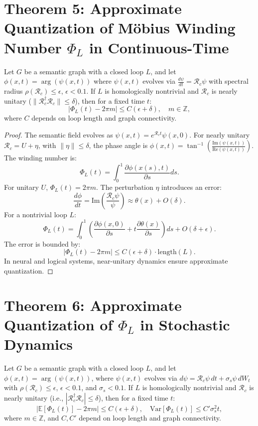 \documentclass[12pt]{article}
\begin{document}
\section*{Theorem 5: Approximate Quantization of Möbius Winding Number \(\Phi_L\) in Continuous-Time}
\begin{theorem}
Let \(G\) be a semantic graph with a closed loop \(L\), and let \(\phi(x,t) = \arg(\psi(x,t))\) where \(\psi(x,t)\) evolves via \(\frac{d\psi}{dt} = \mathcal{R}_c \psi\) with spectral radius \(\rho(\mathcal{R}_c) \leq \epsilon\), \(\epsilon < 0.1\). If \(L\) is homologically nontrivial and \(\mathcal{R}_c\) is nearly unitary (\(\|\mathcal{R}_c^\dagger \mathcal{R}_c\| \leq \delta\)), then for a fixed time \(t\):
\[
\left| \Phi_L(t) - 2\pi m \right| \leq C (\epsilon + \delta), \quad m \in \mathbb{Z},
\]
where \(C\) depends on loop length and graph connectivity.
\end{theorem}

\begin{proof}
The semantic field evolves as \(\psi(x,t) = e^{\mathcal{R}_c t} \psi(x,0)\). For nearly unitary \(\mathcal{R}_c = U + \eta\), with \(\|\eta\| \leq \delta\), the phase angle is \(\phi(x,t) = \tan^{-1}\left(\frac{\text{Im}(\psi(x,t))}{\text{Re}(\psi(x,t))}\right)\). The winding number is:
\[
\Phi_L(t) = \int_0^1 \frac{\partial \phi(x(s),t)}{\partial s} ds.
\]
For unitary \(U\), \(\Phi_L(t) = 2\pi m\). The perturbation \(\eta\) introduces an error:
\[
\frac{d\phi}{dt} = \text{Im}\left( \frac{\mathcal{R}_c \psi}{\psi} \right) \approx \theta(x) + O(\delta).
\]
For a nontrivial loop \(L\):
\[
\Phi_L(t) = \int_0^1 \left( \frac{\partial \phi(x,0)}{\partial s} + t \frac{\partial \theta(x)}{\partial s} \right) ds + O(\delta + \epsilon).
\]
The error is bounded by:
\[
\left| \Phi_L(t) - 2\pi m \right| \leq C (\epsilon + \delta) \cdot \text{length}(L).
\]
In neural and logical systems, near-unitary dynamics ensure approximate quantization.
\end{proof}
\section*{Theorem 6: Approximate Quantization of \(\Phi_L\) in Stochastic Dynamics}
\begin{theorem}
Let $G$ be a semantic graph with a closed loop $L$, and let $\phi(x,t) = \arg(\psi(x,t))$, where $\psi(x,t)$ evolves via $d\psi = \mathcal{R}_c \psi\, dt + \sigma_s \psi\, dW_t$ with $\rho(\mathcal{R}_c) \leq \epsilon$, $\epsilon < 0.1$, and $\sigma_s < 0.1$. If $L$ is homologically nontrivial and $\mathcal{R}_c$ is nearly unitary (i.e., $|\mathcal{R}_c^\dagger \mathcal{R}_c| \leq \delta$), then for a fixed time $t$:
$$
\left| \mathbb{E}[\Phi_L(t)] - 2\pi m \right| \leq C (\epsilon + \delta), \quad \text{Var}[\Phi_L(t)] \leq C' \sigma_s^2 t,
$$
where $m \in \mathbb{Z}$, and $C, C'$ depend on loop length and graph connectivity.
\end{theorem}
\end{document}
